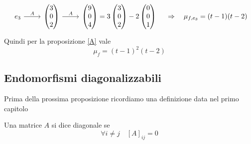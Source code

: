 \begin{ex}
$$
\begin{tikzcd} e_3 \arrow[r,"A"] &\begin{pmatrix}
3 \\ 0 \\2 
\end{pmatrix} \arrow[r,"A"] &\begin{pmatrix}
9 \\ 0 \\4
\end{pmatrix} = 3\begin{pmatrix}
3 \\ 0 \\2 
\end{pmatrix} - 2\begin{pmatrix} 0 \\ 0 \\1
\end{pmatrix} 
\end{tikzcd} \quad \implica \quad \mu_{f,e_3} = (t-1)(t-2)$$
Quindi per la proposizione \ref{A} vale
$$ \mu_f = (t-1)^2 (t-2)$$
\end{ex}
\newpage
\subsection{Endomorfismi diagonalizzabili}
Prima della prossima proposizione ricordiamo una definizione data nel primo capitolo
\begin{defn} Una matrice $A$ si dice diagonale se
$$ \forall i\neq j \quad [A]_{ij}=0 $$
\end{defn}
\spazio


